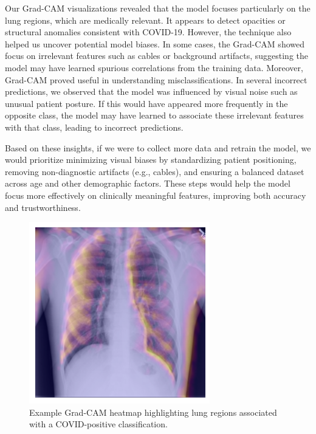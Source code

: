 \documentclass[conference]{IEEEtran}
\begin{document}
Our Grad-CAM visualizations revealed that the model focuses particularly on the lung regions, which are medically relevant. It appears to detect opacities or structural anomalies consistent with COVID-19. However, the technique also helped us uncover potential model biases. In some cases, the Grad-CAM showed focus on irrelevant features such as cables or background artifacts, suggesting the model may have learned spurious correlations from the training data. 
Moreover, Grad-CAM proved useful in understanding misclassifications. In several incorrect predictions, we observed that the model was influenced by visual noise such as unusual patient posture. If this would have appeared more frequently in the opposite class, the model may have learned to associate these irrelevant features with that class, leading to incorrect predictions. 

Based on these insights, if we were to collect more data and retrain the model, we would prioritize minimizing visual biases by standardizing patient positioning, removing non-diagnostic artifacts (e.g., cables), and ensuring a balanced dataset across age and other demographic factors. These steps would help the model focus more effectively on clinically meaningful features, improving both accuracy and trustworthiness.

\begin{figure}[H] \centering \includegraphics[width=0.8\columnwidth]{gradcam_example.png} \caption{Example Grad-CAM heatmap highlighting lung regions associated with a COVID-positive classification.} \label{fig:gradcam_example} \end{figure}
\end{document}
